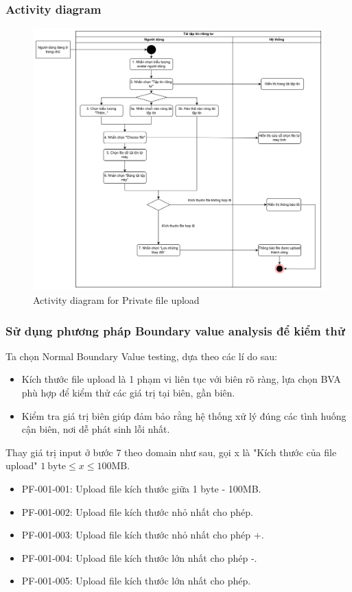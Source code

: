\subsubsection{Activity diagram}
\begin{figure}[H]
    \centering
    \includegraphics[width=\textwidth]{image/private-file-upload.png}
    \caption{Activity diagram for Private file upload}
    \label{fig:activity-diagram-private-file-upload}
\end{figure}
\subsubsection{Sử dụng phương pháp Boundary value analysis để kiểm thử}
Ta chọn Normal Boundary Value testing, dựa theo các lí do sau:
\begin{itemize}
    \item Kích thước file upload là 1 phạm vi liên tục với biên rõ ràng, lựa chọn BVA phù hợp để kiểm thử các giá trị tại biên, gần biên.
    \item Kiểm tra giá trị biên giúp đảm bảo rằng hệ thống xử lý đúng các tình huống cận biên, nơi dễ phát sinh lỗi nhất.
\end{itemize}
Thay giá trị input ở bước 7 theo domain như sau, gọi x là "Kích thước của file upload" \(1\ \text{byte} \leq x \leq 100\text{MB}\).
\begin{itemize}
    \item PF-001-001: Upload file kích thước giữa 1 byte - 100MB.
    \item PF-001-002: Upload file kích thước nhỏ nhất cho phép.
    \item PF-001-003: Upload file kích thước nhỏ nhất cho phép +.
    \item PF-001-004: Upload file kích thước lớn nhất cho phép -.
    \item PF-001-005: Upload file kích thước lớn nhất cho phép.
\end{itemize}
